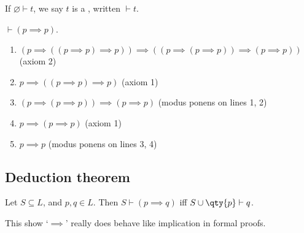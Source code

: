 \begin{definition}[Theorem]
    If $\varnothing \vdash t$, we say $t$ is a , written $\vdash t$.
\end{definition}

\begin{example}
    $\vdash (p \implies p)$.
    \begin{enumerate}
        \item $(p \implies ((p \implies p) \implies p)) \implies ((p \implies (p \implies p)) \implies (p \implies p))$ (axiom 2)
        \item $p \implies ((p \implies p) \implies p)$ (axiom 1)
        \item $(p \implies (p \implies p)) \implies (p \implies p)$ (modus ponens on lines 1, 2)
        \item $p \implies (p \implies p)$ (axiom 1)
        \item $p \implies p$ (modus ponens on lines 3, 4)
    \end{enumerate}
\end{example}

\subsection{Deduction theorem}
\begin{theorem} \label{thm:ded}
    Let $S \subseteq L$, and $p, q \in L$.
    Then $S \vdash (p \implies q)$ iff $S \cup \qty{p} \vdash q$.
\end{theorem}

\begin{remark}
    This show `$\implies$' really does behave like implication in formal proofs.
\end{remark}

